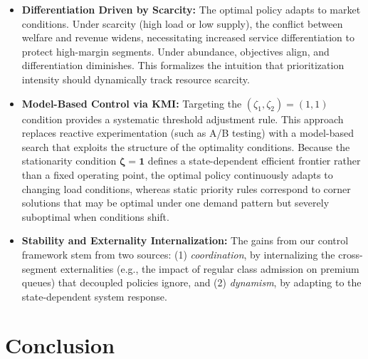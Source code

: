 \begin{itemize}
    \item \textbf{Differentiation Driven by Scarcity:} 
    The optimal policy adapts to market conditions.
    Under scarcity (high load or low supply), the conflict between welfare and revenue widens, necessitating increased service differentiation to protect high-margin segments.
    Under abundance, objectives align, and differentiation diminishes.
    This formalizes the intuition that prioritization intensity should dynamically track resource scarcity.
    
    \item \textbf{Model-Based Control via KMI:}
    Targeting the $(\zeta_1,\zeta_2)=(1,1)$ condition provides a systematic threshold adjustment rule.
    This approach replaces reactive experimentation (such as A/B testing) with a model-based search that exploits the structure of the optimality conditions.
    Because the stationarity condition $\boldsymbol{\zeta} = \mathbf{1}$ defines a state-dependent efficient frontier rather than a fixed operating point, the optimal policy continuously adapts to changing load conditions, whereas static priority rules correspond to corner solutions that may be optimal under one demand pattern but severely suboptimal when conditions shift.
    
    \item \textbf{Stability and Externality Internalization:} 
    The gains from our control framework stem from two sources: (1) \emph{coordination}, by internalizing the cross-segment externalities (e.g., the impact of regular class admission on premium queues) that decoupled policies ignore, and (2) \emph{dynamism}, by adapting to the state-dependent system response.
\end{itemize}

\section{Conclusion}\label{sec:Conclusion}
%

